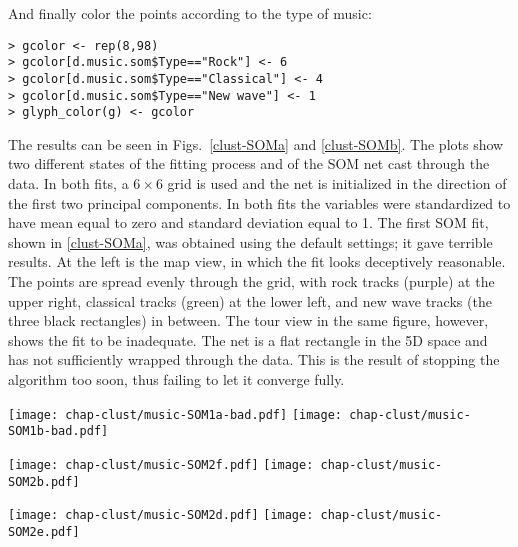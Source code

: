 \noindent And finally color the points according to the type of music:

\begin{verbatim}
> gcolor <- rep(8,98)
> gcolor[d.music.som$Type=="Rock"] <- 6
> gcolor[d.music.som$Type=="Classical"] <- 4
> gcolor[d.music.som$Type=="New wave"] <- 1
> glyph_color(g) <- gcolor
\end{verbatim}

The results can be seen in Figs.~\ref{clust-SOMa} and
\ref{clust-SOMb}. The plots show two different states of the fitting
process and of the SOM net cast through the data. In both fits, a
$6\times 6$ grid is used and the net is initialized in the direction
of the first two principal components. In both fits the variables were
standardized to have mean equal to zero and standard deviation equal
to 1. The first SOM fit, shown in \ref{clust-SOMa}, was obtained using
the default settings; it gave terrible results.  At the left is the
map view, in which the fit looks deceptively reasonable.  The points
are spread evenly through the grid, with rock tracks (purple) at the
upper right, classical tracks (green) at the lower left, and new wave
tracks (the three black rectangles) in between.  The tour view in the
same figure, however, shows the fit to be inadequate.  The net is a
flat rectangle in the 5D space and has not sufficiently wrapped
through the data. This is the result of stopping the algorithm too
soon, thus failing to let it converge fully.

\begin{figure*}[thbp]
\centerline{{\texttt{[image: chap-clust/music-SOM1a-bad.pdf]}}
 {\texttt{[image: chap-clust/music-SOM1b-bad.pdf]}}}
\caption[Unsuccessful SOM fit]{Unsuccessful SOM fit shown in a 2D map
view and a tour projection.  Although the fit looks good in the map
view, the view of the fit in the 5D data space shows that the net has
not sufficiently wrapped into the data: The algorithm has not
converged fully.}
\label{clust-SOMa}
\end{figure*}

\begin{figure*}[bhtp]
\centerline{{\texttt{[image: chap-clust/music-SOM2f.pdf]}}
 {\texttt{[image: chap-clust/music-SOM2b.pdf]}}}
\smallskip
\centerline{{\texttt{[image: chap-clust/music-SOM2d.pdf]}}
 {\texttt{[image: chap-clust/music-SOM2e.pdf]}}}
\caption[Successful SOM fit]{Successful SOM fit shown in a 2D map
view and tour projections.  Here we see a more successful SOM fit,
using standardized data.  The net wraps through the nonlinear
dependencies in the data, but some outliers remain.  }
\label{clust-SOMb}
\end{figure*}

